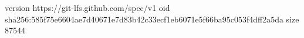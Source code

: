 version https://git-lfs.github.com/spec/v1
oid sha256:585f75e6604ae7d40671e7d83b42c33ecf1eb6071e5f66ba95c053f4dff2a5da
size 87544
